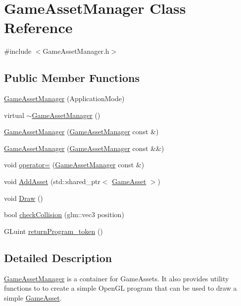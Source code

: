 \hypertarget{classGameAssetManager}{}\section{Game\+Asset\+Manager Class Reference}
\label{classGameAssetManager}


{\ttfamily \#include $<$Game\+Asset\+Manager.\+h$>$}

\subsection*{Public Member Functions}
\begin{DoxyCompactItemize}
\item 
\hyperlink{classGameAssetManager_aaa0d58e276cc10ad91a7457085598a71}{Game\+Asset\+Manager} (Application\+Mode)
\item 
virtual \hyperlink{classGameAssetManager_a1270bd61ecbcca563f079803e40c9b77}{$\sim$\+Game\+Asset\+Manager} ()
\item 
\hyperlink{classGameAssetManager_a2c9adcb72faa154c87eadc9bafe5269d}{Game\+Asset\+Manager} (\hyperlink{classGameAssetManager}{Game\+Asset\+Manager} const \&)
\item 
\hyperlink{classGameAssetManager_a44f6e2fd6b8ff1dd64e5697f1be7386d}{Game\+Asset\+Manager} (\hyperlink{classGameAssetManager}{Game\+Asset\+Manager} const \&\&)
\item 
void \hyperlink{classGameAssetManager_ac72678a4ad5378c685aa6bae84a4e712}{operator=} (\hyperlink{classGameAssetManager}{Game\+Asset\+Manager} const \&)
\item 
void \hyperlink{classGameAssetManager_ad3de8ff00d55ba04728b1de8213b2349}{Add\+Asset} (std\+::shared\+\_\+ptr$<$ \hyperlink{classGameAsset}{Game\+Asset} $>$)
\item 
void \hyperlink{classGameAssetManager_a32837132bd70a9a9ed537323c2d3d886}{Draw} ()
\item 
bool \hyperlink{classGameAssetManager_a72a6dcaaa2a17318df017467a2184b53}{check\+Collision} (glm\+::vec3 position)
\item 
G\+Luint \hyperlink{classGameAssetManager_a80bf9227a397b4aa416388ef94352e29}{return\+Program\+\_\+token} ()
\end{DoxyCompactItemize}


\subsection{Detailed Description}
\hyperlink{classGameAssetManager}{Game\+Asset\+Manager} is a container for Game\+Assets. It also provides utility functions to to create a simple Open\+GL program that can be used to draw a simple \hyperlink{classGameAsset}{Game\+Asset}. 

